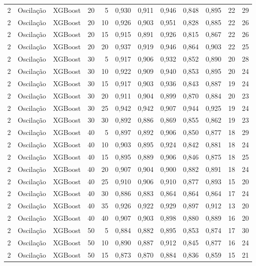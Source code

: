 \begin{longtable}{@{}rllrrrrrrrrr@{}}
2 & Oscilação & XGBoost & 20 & 5 & 0,930 & 0,911 & 0,946 & 0,848 & 0,895 & 22 & 29 \\
2 & Oscilação & XGBoost & 20 & 10 & 0,926 & 0,903 & 0,951 & 0,828 & 0,885 & 22 & 26 \\
2 & Oscilação & XGBoost & 20 & 15 & 0,915 & 0,891 & 0,926 & 0,815 & 0,867 & 22 & 26 \\
2 & Oscilação & XGBoost & 20 & 20 & 0,937 & 0,919 & 0,946 & 0,864 & 0,903 & 22 & 25 \\
2 & Oscilação & XGBoost & 30 & 5 & 0,917 & 0,906 & 0,932 & 0,852 & 0,890 & 20 & 28 \\
2 & Oscilação & XGBoost & 30 & 10 & 0,922 & 0,909 & 0,940 & 0,853 & 0,895 & 20 & 24 \\
2 & Oscilação & XGBoost & 30 & 15 & 0,917 & 0,903 & 0,936 & 0,843 & 0,887 & 19 & 24 \\
2 & Oscilação & XGBoost & 30 & 20 & 0,911 & 0,904 & 0,899 & 0,870 & 0,884 & 20 & 23 \\
2 & Oscilação & XGBoost & 30 & 25 & 0,942 & 0,942 & 0,907 & 0,944 & 0,925 & 19 & 24 \\
2 & Oscilação & XGBoost & 30 & 30 & 0,892 & 0,886 & 0,869 & 0,855 & 0,862 & 19 & 23 \\
2 & Oscilação & XGBoost & 40 & 5 & 0,897 & 0,892 & 0,906 & 0,850 & 0,877 & 18 & 29 \\
2 & Oscilação & XGBoost & 40 & 10 & 0,903 & 0,895 & 0,924 & 0,842 & 0,881 & 18 & 24 \\
2 & Oscilação & XGBoost & 40 & 15 & 0,895 & 0,889 & 0,906 & 0,846 & 0,875 & 18 & 25 \\
2 & Oscilação & XGBoost & 40 & 20 & 0,907 & 0,904 & 0,900 & 0,882 & 0,891 & 18 & 24 \\
2 & Oscilação & XGBoost & 40 & 25 & 0,910 & 0,906 & 0,910 & 0,877 & 0,893 & 15 & 20 \\
2 & Oscilação & XGBoost & 40 & 30 & 0,886 & 0,883 & 0,864 & 0,864 & 0,864 & 17 & 24 \\
2 & Oscilação & XGBoost & 40 & 35 & 0,926 & 0,922 & 0,929 & 0,897 & 0,912 & 13 & 20 \\
2 & Oscilação & XGBoost & 40 & 40 & 0,907 & 0,903 & 0,898 & 0,880 & 0,889 & 16 & 20 \\
2 & Oscilação & XGBoost & 50 & 5 & 0,884 & 0,882 & 0,895 & 0,853 & 0,874 & 17 & 30 \\
2 & Oscilação & XGBoost & 50 & 10 & 0,890 & 0,887 & 0,912 & 0,845 & 0,877 & 16 & 24 \\
2 & Oscilação & XGBoost & 50 & 15 & 0,873 & 0,870 & 0,884 & 0,836 & 0,859 & 15 & 21 \\

\end{longtable}
